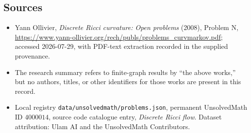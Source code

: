 \documentclass[11pt]{article}
\begin{document}
\subsection{Sources}
\begin{itemize}
\item Yann Ollivier, \emph{Discrete Ricci curvature: Open problems} (2008), Problem N, \url{https://www.yann-ollivier.org/rech/publs/problems_curvmarkov.pdf}; accessed 2026-07-29, with PDF-text extraction recorded in the supplied provenance.
\item The research summary refers to finite-graph results by ``the above works,'' but no authors, titles, or other identifiers for those works are present in this record.
\item Local registry \texttt{data/unsolvedmath/problems.json}, permanent UnsolvedMath ID $4000014$, source code catalogue entry, \emph{Discrete Ricci flow}. Dataset attribution: Ulam AI and the UnsolvedMath Contributors.
\end{itemize}
\end{document}
